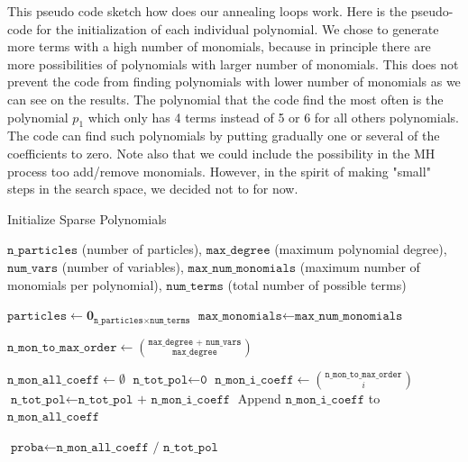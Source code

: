 \documentclass[11pt]{article}
\begin{document}
This pseudo code sketch how does our annealing loops work. Here is the pseudo-code for the initialization of each individual polynomial. We chose to generate more terms with a high number of monomials, because in principle there are more possibilities of polynomials with larger number of monomials. This does not prevent the code from finding polynomials with lower number of monomials as we can see on the results. The polynomial that the code find the most often is the polynomial $p_1$ which only has 4 terms instead of 5 or 6 for all others polynomials. The code can find such polynomials by putting gradually one or several of the coefficients to zero. Note also that we could include the possibility in the MH process too add/remove monomials. However, in the spirit of making "small" steps in the search space, we decided not to for now. 
\begin{algorithm}
	\caption{Initialize Sparse Polynomials}
	\label{alg:initialize-sparse}
	\begin{algorithmic}[1]
		\Require $\texttt{n\_particles}$ (number of particles), $\texttt{max\_degree}$ (maximum polynomial degree), $\texttt{num\_vars}$ (number of variables), $\texttt{max\_num\_monomials}$ (maximum number of monomials per polynomial), $\texttt{num\_terms}$ (total number of possible terms)
		
		\State $\texttt{particles} \leftarrow \mathbf{0}_{\texttt{n\_particles} \times \texttt{num\_terms}}$
		\State $\texttt{max\_monomials} \leftarrow \texttt{max\_num\_monomials}$
		
		\State $\texttt{n\_mon\_to\_max\_order} \leftarrow \binom{\texttt{max\_degree + num\_vars}}{\texttt{max\_degree}}$ 
		
		\State $\texttt{n\_mon\_all\_coeff} \leftarrow \emptyset$
		\State $\texttt{n\_tot\_pol} \leftarrow \texttt{0}$ 
		 
		\State $\texttt{n\_mon\_i\_coeff} \leftarrow \binom{\texttt{n\_mon\_to\_max\_order}}{i}$ 
		\State $\texttt{n\_tot\_pol} \leftarrow \texttt{n\_tot\_pol + n\_mon\_i\_coeff}$
		\State Append $\texttt{n\_mon\_i\_coeff}$ to $\texttt{n\_mon\_all\_coeff}$
		\EndFor
		
		\State $\texttt{proba} \leftarrow \texttt{n\_mon\_all\_coeff / n\_tot\_pol}$ 

		 


\end{algorithmic}
\end{algorithm}
\end{document}
